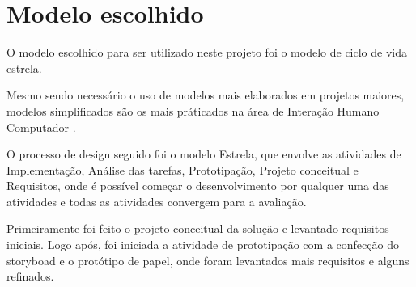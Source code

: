     \section{Modelo escolhido}
    
       O modelo escolhido para ser utilizado neste projeto foi o modelo de ciclo de vida estrela.
    
       Mesmo sendo necessário o uso de modelos mais elaborados em projetos maiores, modelos simplificados são os mais práticados na área de Interação 
       Humano Computador \cite{ihc}.
       
       O processo de design seguido foi o modelo Estrela, que envolve as atividades de Implementação, Análise das tarefas, Prototipação, Projeto 
       conceitual e Requisitos, onde é possível começar o desenvolvimento por qualquer uma das atividades e todas as atividades convergem para 
       a avaliação. 
       
       Primeiramente foi feito o projeto conceitual da solução e levantado requisitos iniciais. Logo após, foi iniciada a atividade de prototipação com a 
       confecção do storyboad e o protótipo de papel, onde foram levantados mais requisitos e alguns refinados.
   

